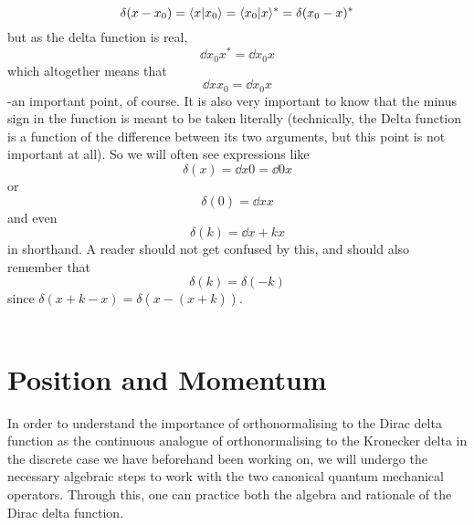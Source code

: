 $$
\delta(x-x_{0})=\langle x|x_{0}\rangle=\langle x_{0}|x\rangle^{\ast}=\delta(x_{0}-x)^{\ast}
$$
but as the delta function is real, 
$$
\dd{x_{0}}{x}^{\ast}=\dd{x_{0}}{x}
$$
which altogether means that 
$$
\dd{x}{x_{0}}=\dd{x_{0}}{x}
$$
-an important point, of course. It is also very important to know that the minus sign in the function is meant to be taken literally (technically, the Delta function is a function of the difference between its two arguments, but this point is not important at all). So we will often see expressions like 
$$
\delta(x)=\dd{x}{0}=\dd{0}{x}
$$
or 
$$
\delta(0)=\dd{x}{x}
$$
and even 
$$
\delta(k)=\dd{x+k}{x}
$$
in shorthand. A reader should not get confused by this, and should also remember that 
$$
\delta(k)=\delta(-k)
$$
since $\delta(x+k-x)=\delta(x-(x+k))$.
\\\\
\section{Position and Momentum}
In order to understand the importance of orthonormalising to the Dirac delta function as the continuous analogue of orthonormalising to the Kronecker delta in the discrete case we have beforehand been working on, we will undergo the necessary algebraic steps to work with the two canonical quantum mechanical operators. Through this, one can practice both the algebra and rationale of the Dirac delta function.
